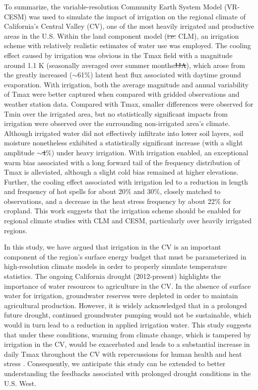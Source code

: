 \documentclass[draft,ms]{agutex}   %
\providecommand{\DIFadd}[1]{{\protect\color{blue}\uwave{#1}}} %
\providecommand{\DIFdel}[1]{{\protect\color{red}\sout{#1}}}                      %
\providecommand{\DIFaddbegin}{} %
\providecommand{\DIFaddend}{} %
\providecommand{\DIFdelbegin}{} %
\providecommand{\DIFdelend}{} %
\begin{document}
\begin{article}
To summarize, the variable-resolution Community Earth System Model (VR-CESM) was used to simulate the impact of irrigation on the regional climate of California's Central Valley (CV), one of the most heavily irrigated and productive areas in the U.S. Within the land component model (\DIFdelbegin \DIFdel{i.e. }\DIFdelend CLM), an irrigation scheme with relatively realistic estimates of water use was employed. The cooling effect caused by irrigation was obvious in the Tmax field with a magnitude around 1.1 K (seasonally averaged over summer months\DIFdelbegin \DIFdel{JJA}\DIFdelend ), which arose from the greatly increased ($\sim$61$\%$) latent heat flux associated with daytime ground evaporation. With irrigation, both the average magnitude and annual variability of Tmax were better captured when compared with gridded observations and weather station data. Compared with Tmax, smaller differences were observed for Tmin over the irrigated area, but no statistically significant impacts from irrigation were observed over the surrounding non-irrigated area's climate. Although irrigated water did not effectively infiltrate into lower soil layers, soil moisture nonetheless exhibited a statistically significant increase (with a slight amplitude $\sim$\DIFdelbegin \DIFdel{4}\DIFdelend \DIFaddbegin \DIFadd{4.4}\DIFaddend $\%$) under heavy irrigation. With irrigation enabled, an exceptional warm bias associated with a long forward tail of the frequency distribution of Tmax is alleviated, although a slight cold bias remained at higher elevations. Further, the cooling effect associated with irrigation led to a reduction in length and frequency of hot spells for about 20$\%$ and 30$\%$, closely matched to observations, and a decrease in the heat stress frequency by about 22$\%$ for cropland. This work suggests that the irrigation scheme should be enabled for regional climate studies with CLM and CESM, particularly over heavily irrigated regions.

In this study, we have argued that irrigation in the CV is an important component of the region's surface energy budget that must be parameterized in high-resolution climate models in order to properly simulate temperature statistics. The ongoing California drought (2012-present) highlights the importance of water resources to agriculture in the CV. In the absence of surface water for irrigation, groundwater reserves were depleted in order to maintain agricultural production.  However, it is widely acknowledged that in a prolonged future drought, continued groundwater pumping would not be sustainable, which would in turn lead to a reduction in applied irrigation water.  This study suggests that under these conditions, warming from climate change, which is tampered by irrigation in the CV, would be exacerbated and leads to a substantial increase in daily Tmax throughout the CV with repercussions for human health and heat stress \citep{williams2015contribution}. Consequently, we anticipate this study can be extended to better understanding the feedbacks associated with prolonged drought conditions in the U.S. West.


\end{article}
\end{document}
